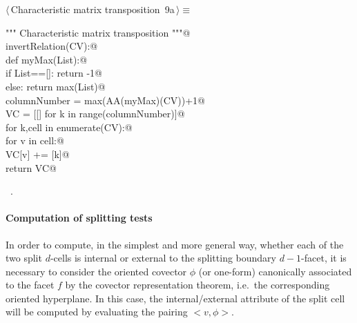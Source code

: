 \documentclass[11pt,oneside]{article}	%
\begin{document}
\begin{flushleft} \small \label{scrap7}
\protect{}$\langle\,$Characteristic matrix transposition\nobreak\ {\footnotesize 9a}$\,\rangle\equiv$
\vspace{-1ex}
\begin{list}{}{} \item
\mbox{}\verb@""" Characteristic matrix transposition """@\\
\mbox{}\verb@def invertRelation(CV):@\\
\mbox{}\verb@   def myMax(List):@\\
\mbox{}\verb@      if List==[]: return -1@\\
\mbox{}\verb@      else: return max(List)@\\
\mbox{}\verb@   columnNumber = max(AA(myMax)(CV))+1@\\
\mbox{}\verb@   VC = [[] for k in range(columnNumber)]@\\
\mbox{}\verb@   for k,cell in enumerate(CV):@\\
\mbox{}\verb@      for v in cell:@\\
\mbox{}\verb@         VC[v] += [k]@\\
\mbox{}\verb@   return VC@\\
\mbox{}\verb@@{\NWsep}
\end{list}
\vspace{-1ex}
\footnotesize\addtolength{\baselineskip}{-1ex}
\begin{list}{}{\setlength{\itemsep}{-\parsep}\setlength{\itemindent}{-\leftmargin}}
\item \NWtxtMacroRefIn\ .
\end{list}
\end{flushleft}


\paragraph{Computation of splitting tests}

In order to compute, in the simplest and more general way, whether each of the two split $d$-cells is internal or external to the splitting boundary $d-1$-facet, it is necessary to consider the oriented covector $\phi$ (or one-form) canonically associated to the facet $f$ by the covector representation theorem, i.e.~the corresponding oriented hyperplane. In this case, the internal/external attribute of the split cell will be computed by evaluating the pairing $<v,\phi>$.
\end{document}
